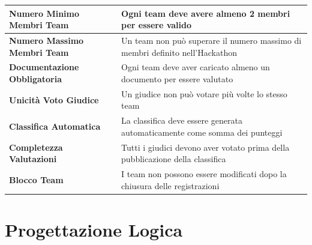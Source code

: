 \documentclass[a4paper, 10pt]{article}
\begin{document}
{\begin{longtable}{
				>{\raggedright\arraybackslash}p{5.5cm}
				>{\raggedright\arraybackslash}p{10cm}
			}
			\textbf{Numero Minimo Membri Team} &
			Ogni team deve avere almeno 2 membri per essere valido \\
			\hline
			
			\textbf{Numero Massimo Membri Team} &
			Un team non può superare il numero massimo di membri definito nell'Hackathon \\
			\hline
			
			\textbf{Documentazione Obbligatoria} &
			Ogni team deve aver caricato almeno un documento per essere valutato \\
			\hline
			
			\textbf{Unicità Voto Giudice} &
			Un giudice non può votare più volte lo stesso team\\
			\hline
			
			\textbf{Classifica Automatica} &
			La classifica deve essere generata automaticamente come somma dei punteggi\\
			\hline
			
			\textbf{Completezza Valutazioni} &
			Tutti i giudici devono aver votato prima della pubblicazione della classifica \\
			\hline
			
			\textbf{Blocco Team} &
			I team non possono essere modificati dopo la chiusura delle registrazioni
		\end{longtable}
	}
	\newpage
	\section{Progettazione Logica}
\end{document}
